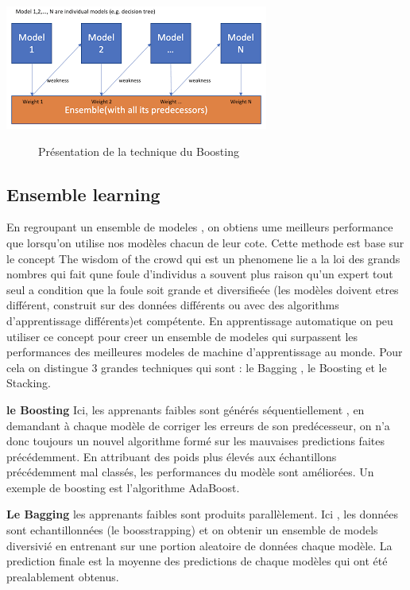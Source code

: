 \documentclass[french,a4paper,12pt]{article}
\begin{document}
 \begin{center}
\includegraphics[scale=1]{boosting definition.png}
\begin{figure}[h]
\caption{Présentation de la technique du Boosting}
\end{figure}
\end{center}
\subsection{ Ensemble learning}

\quad En regroupant un ensemble de modeles , on obtiens ume meilleurs performance que lorsqu’on utilise nos modèles chacun de leur cote. Cette methode est base sur le concept The wisdom of the crowd qui est un phenomene lie a la loi des grands nombres qui fait qune foule d’individus a souvent plus raison qu’un expert tout seul  a condition que la foule soit grande et diversifieée (les modèles doivent etres différent, construit sur des données différents ou avec des algorithms d’apprentissage différents)et compétente. En apprentissage automatique on peu  utiliser ce concept pour creer un ensemble de modeles qui surpassent les performances des meilleures modeles de machine d’apprentissage au monde. Pour cela on distingue 3 grandes techniques qui sont : le Bagging , le Boosting et le Stacking.  

\textbf{le Boosting} 
\quad Ici, les apprenants faibles sont générés séquentiellement  , en demandant à chaque modèle de corriger les erreurs de son predécesseur, on n’a donc toujours un nouvel algorithme formé sur les mauvaises predictions faites précédemment. En attribuant des poids plus élevés aux échantillons précédemment mal classés, les performances du modèle sont améliorées. Un exemple de boosting est l'algorithme AdaBoost.

\textbf{Le Bagging} 
\quad les apprenants faibles sont produits parallèlement. Ici , les données sont echantillonnées (le boosstrapping) et on obtenir un ensemble de models diversivié en entrenant sur une portion aleatoire de données chaque modèle. La prediction finale est la moyenne des predictions de chaque modèles qui ont été prealablement obtenus. 
\end{document}
